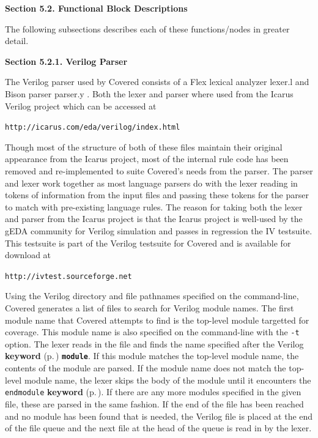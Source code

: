 \begin{Desc}
\item[{\bf Section 5.2.  Functional Block Descriptions}]\par
 The following subsections describes each of these functions/nodes in greater detail.\end{Desc}
\begin{Desc}
\item[{\bf Section 5.2.1.  Verilog Parser}]\par
 The Verilog parser used by Covered consists of a Flex lexical analyzer lexer.l and  Bison parser parser.y . Both the lexer and parser where used from the Icarus Verilog project which can be accessed at

 {\tt http://icarus.com/eda/verilog/index.html}

 Though most of the structure of both of these files maintain their original appearance from the Icarus project, most of the internal rule code has been removed and re-implemented to suite Covered's needs from the parser. The parser and lexer work together as most language parsers do with the lexer reading in tokens of information from the input files and passing these tokens for the parser to match with pre-existing language rules. The reason for taking both the lexer and parser from the Icarus project is that the Icarus project is well-used by the g\-EDA community for Verilog simulation and passes in regression the IV testsuite. This testsuite is part of the Verilog testsuite for Covered and is available for download at

 {\tt http://ivtest.sourceforge.net}

 Using the Verilog directory and file pathnames specified on the command-line, Covered generates a list of files to search for Verilog module names. The first module name that Covered attempts to find is the top-level module targetted for coverage. This module name is also specified on the command-line with the {\tt -t} option. The lexer reads in the file and finds the name specified after the Verilog {\bf keyword} {\rm (p.\,\pageref{structkeyword})} {\tt {\bf module}}. If this module matches the top-level module name, the contents of the module are parsed. If the module name does not match the top-level module name, the lexer skips the body of the module until it  encounters the {\tt endmodule} {\bf keyword} {\rm (p.\,\pageref{structkeyword})}. If there are any more modules specified in the given file, these are parsed in the same fashion. If the end of the file has been reached and no module has been found that is needed, the Verilog file is placed at the end of the file  queue and the next file at the head of the queue is read in by the lexer.


\end{Desc}
